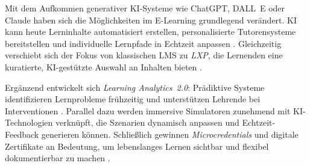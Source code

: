 Mit dem Aufkommen generativer KI-Systeme wie ChatGPT, DALL~E oder Claude haben sich die Möglichkeiten im E-Learning grundlegend verändert. \acs{KI} kann heute Lerninhalte automatisiert erstellen, personalisierte Tutorensysteme bereitstellen und individuelle Lernpfade in Echtzeit anpassen \parencite[S.~43]{zhai_chatgpt_2023}. Gleichzeitig verschiebt sich der Fokus von klassischen \acs{LMS} zu \textit{\ac{LXP}}, die Lernenden eine kuratierte, KI-gestützte Auswahl an Inhalten bieten \parencite[S.~1]{cockrill_learning_2021}.

Ergänzend entwickelt sich \textit{Learning Analytics~2.0}: Prädiktive Systeme identifizieren Lernprobleme frühzeitig und unterstützen Lehrende bei Interventionen \parencite[S.~1979f]{ifenthaler_utilising_2020}. Parallel dazu werden immersive Simulatoren zunehmend mit KI-Technologien verknüpft, die Szenarien dynamisch anpassen und Echtzeit-Feedback generieren können. Schließlich gewinnen \textit{Microcredentials} und digitale Zertifikate an Bedeutung, um lebenslanges Lernen sichtbar und flexibel dokumentierbar zu machen \parencite[S.~1]{gish-lieberman_micro-credentials_2021}.

